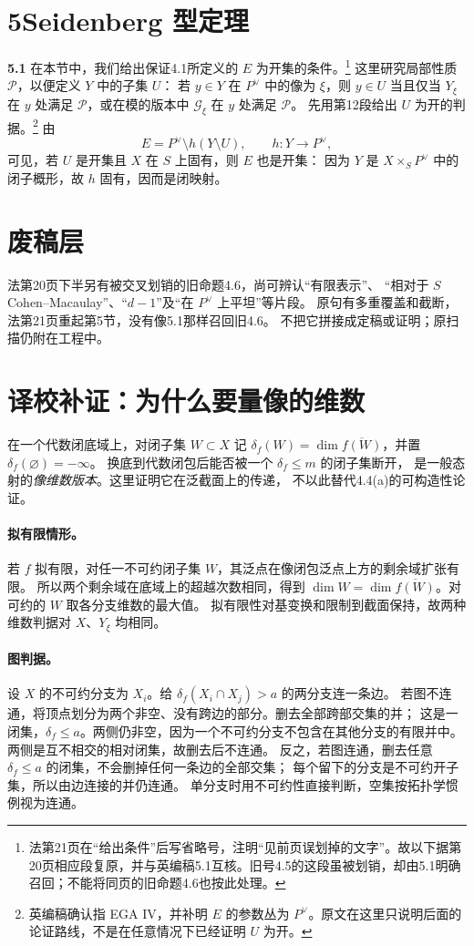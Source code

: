 \documentclass[openany,fontset=fandol]{ctexbook}
\newcommand{\GG}{\mathcal G}
\newcommand{\dd}{\delta}
\newcommand{\tagitem}[2]{\par\medskip\noindent\textbf{#1\quad #2}\enspace}
\begin{document}
\section*{5\quad Seidenberg 型定理}
\tagitem{5.1}{}
在本节中，我们给出保证4.1所定义的 $E$ 为开集的条件。\footnote{法第21页在“给出条件”后写省略号，注明“见前页误划掉的文字”。故以下据第20页相应段复原，并与英编稿5.1互核。旧号4.5的这段虽被划销，却由5.1明确召回；不能将同页的旧命题4.6也按此处理。}
这里研究局部性质 $\mathcal P$，以便定义 $Y$ 中的子集 $U$：
若 $y\in Y$ 在 $P^\vee$ 中的像为 $\xi$，则 $y\in U$ 当且仅当
$Y_\xi$ 在 $y$ 处满足 $\mathcal P$，或在模的版本中 $\GG_\xi$ 在 $y$ 处满足 $\mathcal P$。
先用第12段给出 $U$ 为开的判据。\footnote{英编稿确认指 EGA IV，并补明 $E$ 的参数丛为 $P^\vee$。原文在这里只说明后面的论证路线，不是在任意情况下已经证明 $U$ 为开。}
由
\[
 E=P^\vee\setminus h(Y\setminus U),\qquad h:Y\longrightarrow P^\vee,
\]
可见，若 $U$ 是开集且 $X$ 在 $S$ 上固有，则 $E$ 也是开集：
因为 $Y$ 是 $X\times_S P^\vee$ 中的闭子概形，故 $h$ 固有，因而是闭映射。

\section*{废稿层}
法第20页下半另有被交叉划销的旧命题4.6，尚可辨认“有限表示”、
“相对于 $S$ Cohen--Macaulay”、“$d-1$”及“在 $P^\vee$ 上平坦”等片段。
原句有多重覆盖和截断，法第21页重起第5节，没有像5.1那样召回旧4.6。
不把它拼接成定稿或证明；原扫描仍附在工程中。

\section*{译校补证：为什么要量像的维数}
在一个代数闭底域上，对闭子集 $W\subset X$ 记
$\dd_f(W)=\dim\overline{f(W)}$，并置 $\dd_f(\varnothing)=-\infty$。
换底到代数闭包后能否被一个 $\dd_f\leq m$ 的闭子集断开，
是一般态射的\emph{像维数版本}。这里证明它在泛截面上的传递，
不以此替代4.4(a)的可构造性论证。

\paragraph{拟有限情形。}
若 $f$ 拟有限，对任一不可约闭子集 $W$，其泛点在像闭包泛点上方的剩余域扩张有限。
所以两个剩余域在底域上的超越次数相同，得到
$\dim W=\dim\overline{f(W)}$。对可约的 $W$ 取各分支维数的最大值。
拟有限性对基变换和限制到截面保持，故两种维数判据对 $X$、$Y_\xi$ 均相同。

\paragraph{图判据。}
设 $X$ 的不可约分支为 $X_i$。给 $\dd_f(X_i\cap X_j)>a$ 的两分支连一条边。
若图不连通，将顶点划分为两个非空、没有跨边的部分。删去全部跨部交集的并；
这是一闭集，$\dd_f\leq a$。两侧仍非空，因为一个不可约分支不包含在其他分支的有限并中。
两侧是互不相交的相对闭集，故删去后不连通。
反之，若图连通，删去任意 $\dd_f\leq a$ 的闭集，不会删掉任何一条边的全部交集；
每个留下的分支是不可约开子集，所以由边连接的并仍连通。
单分支时用不可约性直接判断，空集按拓扑学惯例视为连通。
\end{document}
